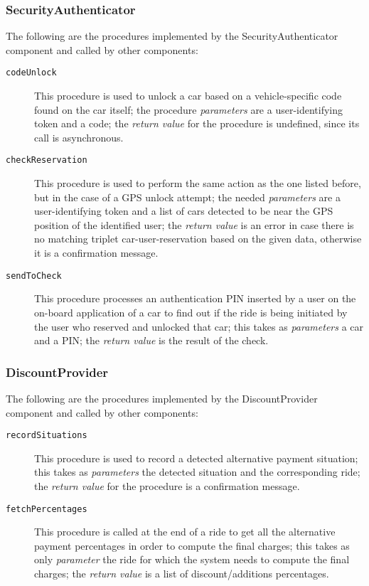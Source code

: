 \subsubsection{SecurityAuthenticator}
The following are the procedures implemented by the SecurityAuthenticator component and called by other components:
\begin{description}
\item[\texttt{codeUnlock}] This procedure is used to unlock a car based on a vehicle-specific code found on the car itself; the procedure \textit{parameters} are a user-identifying token and a code; the \textit{return value} for the procedure is undefined, since its call is asynchronous.
\item[\texttt{checkReservation}] This procedure is used to perform the same action as the one listed before, but in the case of a GPS unlock attempt; the needed \textit{parameters} are a user-identifying token and a list of cars detected to be near the GPS position of the identified user; the \textit{return value} is an error in case there is no matching triplet car-user-reservation based on the given data, otherwise it is a confirmation message.
\item[\texttt{sendToCheck}] This procedure processes an authentication PIN inserted by a user on the on-board application of a car to find out if the ride is being initiated by the user who reserved and unlocked that car; this takes as \textit{parameters} a car and a PIN; the \textit{return value} is the result of the check.
\end{description}
\subsubsection{DiscountProvider}
The following are the procedures implemented by the DiscountProvider component and called by other components:
\begin{description}
\item[\texttt{recordSituations}] This procedure is used to record a detected alternative payment situation; this takes as \textit{parameters} the detected situation and the corresponding ride; the \textit{return value} for the procedure is a confirmation message.
\item[\texttt{fetchPercentages}] This procedure is called at the end of a ride to get all the alternative payment percentages in order to compute the final charges; this takes as only \textit{parameter} the ride for which the system needs to compute the final charges; the \textit{return value} is a list of discount/additions percentages.
\end{description}
